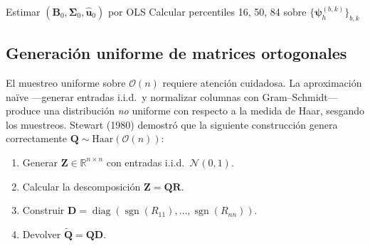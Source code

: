 \documentclass[11pt,letterpaper]{article}
\DeclareMathOperator{\diag}{diag}
\DeclareMathOperator{\sgn}{sgn}
\begin{document}
\begin{algorithm}[H]
\caption{Restricciones de signo con bootstrap recursivo}
\label{alg:signos}
Estimar $(\bm{B}_0, \bm{\Sigma}_0, \hat{\bm{u}}_0)$ por OLS\;
Calcular percentiles 16, 50, 84 sobre $\{\bm{\psi}_h^{(b,k)}\}_{b,k}$
\end{algorithm}

\subsection{Generación uniforme de matrices ortogonales}

El muestreo uniforme sobre $\mathcal{O}(n)$ requiere atención cuidadosa. La aproximación naïve —generar entradas i.i.d.\ y normalizar columnas con Gram--Schmidt— produce una distribución \textit{no} uniforme con respecto a la medida de Haar, sesgando los muestreos. Stewart (1980) demostró que la siguiente construcción genera correctamente $\bm{Q}\sim\mathrm{Haar}(\mathcal{O}(n))$:

\begin{enumerate}
    \item Generar $\bm{Z} \in \mathbb{R}^{n\times n}$ con entradas i.i.d.\ $\mathcal{N}(0,1)$.
    \item Calcular la descomposición $\bm{Z} = \bm{Q}\bm{R}$.
    \item Construir $\bm{D} = \diag(\sgn(R_{11}), \ldots, \sgn(R_{nn}))$.
    \item Devolver $\tilde{\bm{Q}} = \bm{Q}\bm{D}$.
\end{enumerate}
\end{document}
